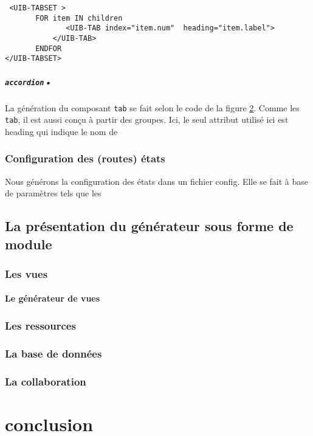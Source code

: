 \documentclass[a4paper,11pt]{report}
\begin{document}
\begin{verbatim}
 <UIB-TABSET >
       FOR item IN children
	          <UIB-TAB index="item.num"  heading="item.label"> 
           </UIB-TAB>
       ENDFOR           
</UIB-TABSET>            
\end{verbatim}

\paragraph{{\tt accordion}•}La génération du composant {\tt tab} se fait selon le code de la figure \ref{}. Comme les {\tt tab}, il est aussi
conçu à partir des groupes. Ici, le seul attribut utilisé ici est \og heading \fg qui indique le nom de 

\subsection{Configuration des (routes) états}

Nous générons la configuration des états dans un fichier config. Elle se fait à base de paramètres tels que les 




\section{La présentation du générateur sous forme de module}



\subsection{Les vues}



\subsubsection{Le générateur de vues}

\subsection{Les ressources}


\subsection{La base de données}

\subsection{La collaboration}


\chapter{conclusion}
\end{document}
